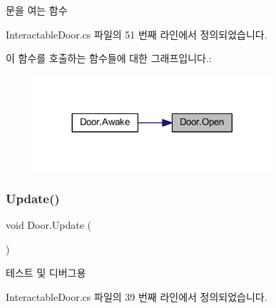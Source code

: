 문을 여는 함수 



Interactable\+Door.\+cs 파일의 51 번째 라인에서 정의되었습니다.


\begin{DoxyCode}{0}

\end{DoxyCode}
이 함수를 호출하는 함수들에 대한 그래프입니다.\+:
\nopagebreak
\begin{figure}[H]
\begin{center}
\leavevmode
\includegraphics[width=248pt]{da/d30/class_door_a31b8ff949e85dddb2585afa106fa5d05_icgraph}
\end{center}
\end{figure}
\mbox{\label{class_door_ac518336e578c8c5f447da92d427716fc}} 
\subsubsection{\texorpdfstring{Update()}{Update()}}
{\footnotesize\ttfamily void Door.\+Update (\begin{DoxyParamCaption}{ }\end{DoxyParamCaption})\hspace{0.3cm}{\ttfamily [private]}}



테스트 및 디버그용 



Interactable\+Door.\+cs 파일의 39 번째 라인에서 정의되었습니다.


